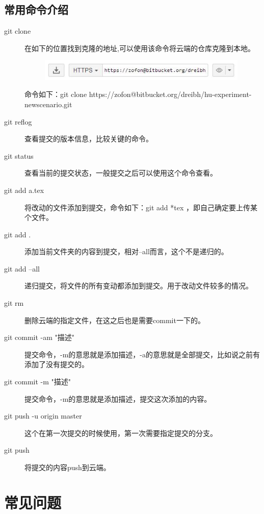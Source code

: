\documentclass[a4paper,12pt]{ctexart}
\begin{document}
\section{常用命令介绍}
\begin{description}
  \item[git clone] 在如下的位置找到克隆的地址,可以使用该命令将云端的仓库克隆到本地。
        \begin{figure}[H]
        \centering
        \includegraphics[width=10cm]{figures/clone_address.jpg}
        \end{figure}
        命令如下：git clone https://zofon@bitbucket.org/dreibh/hu-experiment-newscenario.git

  \item[git reflog] 查看提交的版本信息，比较关键的命令。
  \item[git status] 查看当前的提交状态，一般提交之后可以使用这个命令查看。

  \item[git add a.tex] 将改动的文件添加到提交，命令如下：git add *tex ，即自己确定要上传某个文件。
  \item[git add .] 添加当前文件夹的内容到提交，相对--all而言，这个不是递归的。
  \item[git add --all] 递归提交，将文件的所有变动都添加到提交。用于改动文件较多的情况。

  \item[git rm] 删除云端的指定文件，在这之后也是需要commit一下的。

  \item[git commit -am "描述"] 提交命令，-m的意思就是添加描述，-a的意思就是全部提交，比如说之前有添加了没有提交的。
  \item[git commit -m  "描述"] 提交命令，-m的意思就是添加描述，提交这次添加的内容。

  \item[git push -u origin master] 这个在第一次提交的时候使用，第一次需要指定提交的分支。
  \item[git push] 将提交的内容push到云端。
\end{description}

\newpage
\chapter{常见问题}
\end{document}
